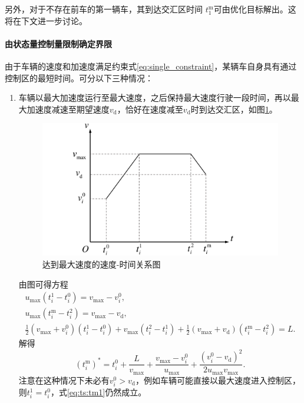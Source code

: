 另外，对于不存在前车的第一辆车，其到达交汇区时间 $t_1^\mathrm{m}$可由优化目标解出。这将在下文进一步讨论。

\paragraph{由状态量控制量限制确定界限}
由于车辆的速度和加速度满足约束式\eqref{eq:single_constraint}，某辆车自身具有通过控制区的最短时间。可分以下三种情况：
\begin{enumerate}[label=(\arabic*)]
\item 车辆以最大加速度运行至最大速度，之后保持最大速度行驶一段时间，再以最大加速度减速至期望速度$v_\mathrm{d}$，恰好在速度减至$v_\mathrm{d}$时到达交汇区，如图\ref{fig:vmax}。
\begin{figure}[htbp]
\centering
\includegraphics[width=12cm]{figures/vmax.pdf}
\caption{达到最大速度的速度-时间关系图}
\label{fig:vmax}
\end{figure}

由图可得方程
\begin{gather}
u_{\max}(t_i^1-t_i^0)=v_{\max}-v_i^0,\\
u_{\max}(t_i^\mathrm{m}-t_i^2)=v_{\max}-v_\mathrm{d},\\
\frac12(v_{\max}+v_i^0)(t_i^1-t_i^0) + v_{\max}(t_i^2-t_i^1) + \frac12(v_{\max}+v_\mathrm{d})(t_i^\mathrm{m}-t_i^2) = L.
\end{gather}
解得
\begin{equation}
(t_i^\mathrm{m})^* = t_i^0 + \frac{L}{v_{\max}} + \frac{v_{\max}-v_i^0}{u_{\max}} + \frac{(v_i^0-v_\mathrm{d})^2}{2u_{\max}v_{\max}}.
\label{eq:ts:tm1}
\end{equation}
注意在这种情况下未必有$v_i^0 > v_\mathrm{d}$，例如车辆可能直接以最大速度进入控制区，则$t_i^1=t_i^0$，式\eqref{eq:ts:tm1}仍然成立。


\end{enumerate}
